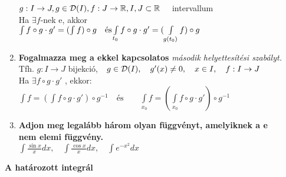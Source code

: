 \documentclass[a4paper,11pt]{article}
\begin{document}
\begin{enumerate}
	$g:I\to J,g\in\mathcal{D}(I),f:J\to\mathbb{R},I,J\subset\mathbb{R}
	\quad$ intervallum\\[0.1cm]Ha $\exists f$-nek \prfv e, akkor\\[0.2cm]
	$\int f\circ g\cdot g'=(\int f)\circ g\quad\text{és}\\[0.2cm]
	\int\limits_{t_0}f\circ g\cdot g'=(\int\limits_{g(t_0)}f)\circ g$
	\item\textbf{Fogalmazza meg a \prfv ekkel kapcsolatos}
	\textit{második helyettesítési szabályt.}\\[0.1cm]
	Tfh. $g:I\to J$ bijekció,$\quad g\in\mathcal{D}(I),\quad g'(x)\neq0,\quad x\in I,\quad
	f:I\to J$\\[0.2cm]Ha $\exists f\circ g\cdot g'$ \prfv, ekkor:\\[0.2cm]
	$\int f=(\int f\circ g\cdot g')\circ g^{-1}\quad\text{és}\quad\quad
	\int\limits_{x_0}f=(\int\limits_{x_0} f\circ g\cdot g')\circ g^{-1}$
	\item\textbf{Adjon meg legalább három olyan függvényt, amelyiknek
	a \prfv e \\ nem elemi függvény.}\\[0.1cm]
	$\int\frac{\sin x}{x}dx,\quad\int\frac{\cos x}{x}dx,\quad
	\int e^{-x^2}dx$
\end{enumerate}
\textbf{{\large A határozott integrál}}
\end{document}
